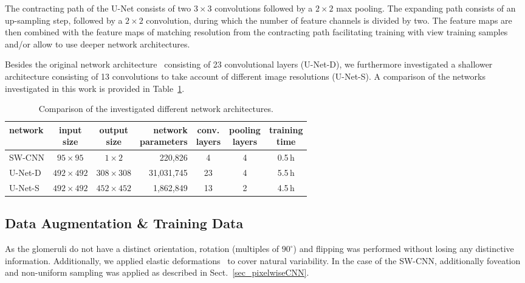 \documentclass{elsarticle}
\begin{document}
The contracting path of the U-Net consists of two $3\times3$ convolutions followed by a $2\times2$ max pooling. The expanding path consists of an up-sampling step, followed by a $2\times2$ convolution, during which the number of feature channels is divided by two. The feature maps are then combined with the feature maps of matching resolution from the contracting path facilitating training with view training samples and/or allow to use deeper network architectures. 

Besides the original network architecture~\citep{myRonneberger15a} consisting of 23 convolutional layers (U-Net-D), we furthermore investigated a shallower architecture consisting of 13 convolutions to take account of different image resolutions (U-Net-S).
%
A comparison of the networks investigated in this work is provided in Table~\ref{tab_techDiffNets}.

\begin{table}[htb]
	\centering \footnotesize
	\renewcommand{\arraystretch}{1}
	\begin{tabular}{l|ccrccc}
		network 		& \makecell{input\\size}& \makecell{output\\size} & \makecell[c]{network\\parameters}  &\makecell{conv.\\layers}& \makecell{pooling\\layers} & \makecell{training\\time}\\ \hline   
		SW-CNN  &  $95\times95$  	&   $1\times2$  	&220,826		& 4  & 4 & 0.5\,h\\
		U-Net-D	& $492\times492$  	&  $308\times308$   &31,031,745   & 23 & 4 &5.5\,h \\
		U-Net-S	& $492\times492$    &  $452\times452$   &1,862,849    & 13 & 2 &4.5\,h
	\end{tabular}
	\caption{Comparison of the investigated different network architectures.}
	\label{tab_techDiffNets}
\end{table}


\subsection{Data Augmentation \& Training Data}
As the glomeruli do not have a distinct orientation, rotation (multiples of $90^\circ$) and flipping was performed without losing any distinctive information.
Additionally, we applied elastic deformations~\citep{myRonneberger15a,bestPractice,whenToWarp} to cover natural variability.
In the case of the SW-CNN, additionally foveation and non-uniform sampling was applied as described in Sect.~\ref{sec_pixelwiseCNN}.
\end{document}
